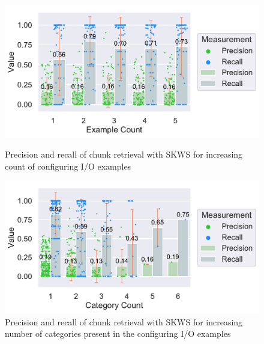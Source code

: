 \documentclass[\myrootdir/main.tex]{subfiles}
\begin{document}
\begin{figure}[htbp]
	\centering
	\begin{minipage}{0.45\textwidth}
		\centering
		\includegraphics[width=\textwidth, clip]{img/big-study/recall-precision-examplecount-SKWS.pdf}
		\caption{Precision and recall of chunk retrieval with SKWS for increasing count of configuring I/O examples}
		\label{fig:recall-precision-examplecount-SKWS}
	\end{minipage}\hfill
	\begin{minipage}{0.45\textwidth}
		\centering
		\includegraphics[width=\textwidth, clip]{img/big-study/recall-precision-categorycount-SKWS.pdf}
		\caption{Precision and recall of chunk retrieval with SKWS for increasing number of categories present in the configuring I/O examples}
		\label{fig:recall-precision-categorycount-SKWS}
	\end{minipage}
\end{figure}
\end{document}
